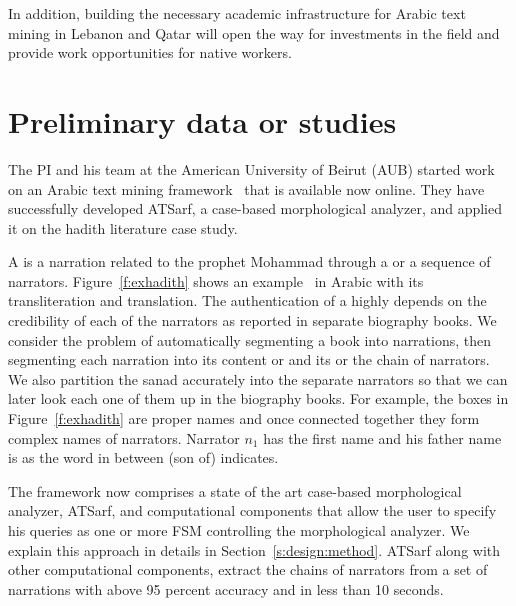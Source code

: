 \documentclass[12pt]{article}
\newcommand{\noArRL}[1]{\arabfalse\RL{#1}\arabtrue}
\newcommand{\noTrRL}[1]{\transfalse\RL{#1}\transtrue}
\begin{document}
In addition, building the necessary academic 
infrastructure for Arabic text mining in Lebanon and Qatar will 
open the way for investments in the field and provide work 
opportunities for native workers.

\pagebreak

\section{Preliminary data or studies}
\label{s:prelim}

\transfalse
\begin{figure}
\end{figure}
\transtrue

The PI and his team at the American University of Beirut (AUB)
started work on an Arabic text mining framework~\cite{ATMine09}
that is available now online.
They have successfully developed ATSarf, a case-based morphological 
analyzer, and applied it on the hadith literature case study. 

A  is a narration related to the prophet Mohammad
through a  or a sequence of narrators. 
Figure~\ref{f:exhadith} shows an example~\noArRL{.hady_t} in Arabic with its 
transliteration and translation. 
The authentication of a \noArRL{.hady_t} highly depends on the credibility
of each of the narrators as reported in separate biography 
books. 
We consider the problem of automatically segmenting
a \noArRL{.hady_t} book into narrations, then segmenting each 
narration into
its content or  and its \noArRL{sanad} or the
chain of narrators.
We also partition the sanad accurately into the 
separate narrators so that we can later look each one of them 
up in the biography books. 
For example, the boxes in Figure~\ref{f:exhadith} are proper names 
and once
connected together they form complex names of narrators. 
Narrator $n_1$ has the first name \noTrRL{qtybT} and his father 
name is \noTrRL{s`yd} as the word in between 
\noTrRL{bn} (son of) indicates. 


The framework now comprises a state of the art
case-based morphological analyzer, ATSarf, 
and computational components that allow the user to
specify his queries as one or more FSM
controlling the morphological analyzer.
We explain this approach in details in 
Section~\ref{s:design:method}.
ATSarf along with other computational components, 
extract the chains of narrators from a set of narrations
with above 95 percent accuracy and in less than 10 seconds. 
\end{document}
